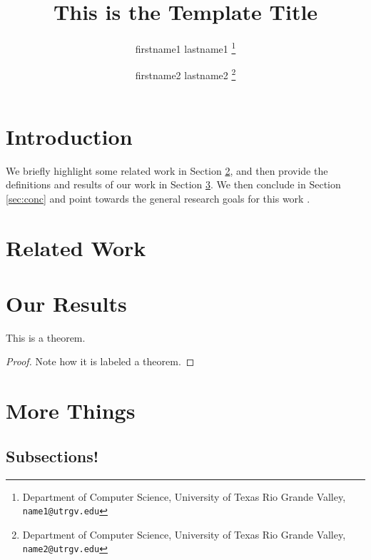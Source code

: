 \documentclass[10pt]{hackr26}
\title{This is the Template Title}
\author{
    firstname1 lastname1
    \thanks{Department of Computer Science, University of Texas Rio Grande Valley, {\tt name1@utrgv.edu}}
    \and
    firstname2 lastname2
    \thanks{Department of Computer Science, University of Texas Rio Grande Valley, {\tt name2@utrgv.edu}}
}
\begin{document}
\maketitle
\begin{abstract}
\lipsum[1-1]
\end{abstract}
\section{Introduction} \label{sec:intro}



\lipsum[2]

We briefly highlight some related work in Section \ref{sec:rel}, and then provide the definitions and results of our work in Section \ref{sec:res}.  We then conclude in Section \ref{sec:conc} and point towards the general research goals for this work \cite{W19}.

\section{Related Work} \label{sec:rel}
\lipsum[3-4]


\section{Our Results} \label{sec:res}
\lipsum[4-4]

\begin{theorem}
    This is a theorem.
\end{theorem}

\begin{proof}
    Note how it is labeled a theorem.
\end{proof}


\section{More Things} \label{sec:c}
\lipsum[2-4]
\subsection{Subsections!}
\lipsum[2]
\end{document}
